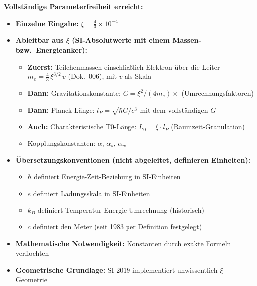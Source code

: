 	\begin{keyresult}
		\textbf{Vollständige Parameterfreiheit erreicht:}
		\begin{itemize}
			\item \textbf{Einzelne Eingabe:} $\xi = \frac{4}{3} \times 10^{-4}$
			
			\item \textbf{Ableitbar aus $\xi$ (SI-Absolutwerte mit einem Massen- bzw.\ Energieanker):}
			\begin{itemize}
				\item \textbf{Zuerst:} Teilchenmassen einschließlich Elektron über die Leiter $m_e = \frac{4}{3}\,\xi^{3/2}\,v$ (Dok.~006), mit $v$ als Skala
				\item \textbf{Dann:} Gravitationskonstante: $G = \xi^2/(4m_e) \times$ (Umrechnungsfaktoren)
				\item \textbf{Dann:} Planck-Länge: $l_P = \sqrt{\hbar G/c^3}$ mit dem vollständigen $G$
				\item \textbf{Auch:} Charakteristische T0-Länge: $L_0 = \xi \cdot l_P$ (Raumzeit-Granulation)
				\item Kopplungskonstanten: $\alpha$, $\alpha_s$, $\alpha_w$
			\end{itemize}
			
			\item \textbf{Übersetzungskonventionen (nicht abgeleitet, definieren Einheiten):}
			\begin{itemize}
				\item $\hbar$ definiert Energie-Zeit-Beziehung in SI-Einheiten
				\item $e$ definiert Ladungsskala in SI-Einheiten
				\item $k_B$ definiert Temperatur-Energie-Umrechnung (historisch)
				\item $c$ definiert den Meter (seit 1983 per Definition festgelegt)
			\end{itemize}
			
			\item \textbf{Mathematische Notwendigkeit:} Konstanten durch exakte Formeln verflochten
			
			\item \textbf{Geometrische Grundlage:} SI 2019 implementiert unwissentlich $\xi$-Geometrie
		\end{itemize}
	\end{keyresult}
	
